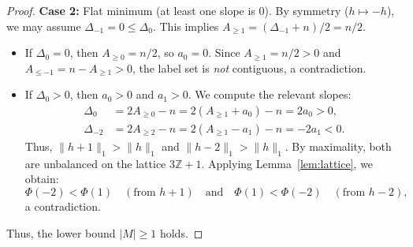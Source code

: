 \documentclass[10pt,a4paper]{amsart}
\newcommand{\Z}{\mathbb{Z}}
\begin{document}
\begin{proof}
\smallskip
\textbf{Case 2:} Flat minimum (at least one slope is 0).
By symmetry ($h \mapsto -h$), we may assume $\Delta_{-1} = 0 \le \Delta_0$. This implies $A_{\ge 1} = (\Delta_{-1}+n)/2 = n/2$.
\begin{itemize}
    \item If $\Delta_0 = 0$, then $A_{\ge 0} = n/2$, so $a_0 = 0$. Since $A_{\ge 1} = n/2 > 0$ and $A_{\le -1} = n-A_{\geq 1} > 0$, the label set is \emph{not} contiguous, a contradiction.
    
    \item If $\Delta_0 > 0$, then $a_0 > 0$ and $a_1 > 0$. We compute the relevant slopes:
    \begin{align*}
        \Delta_0 &= 2A_{\ge 0} - n = 2(A_{\ge 1} + a_0) - n = 2a_0 > 0, \\ 
        \Delta_{-2} &= 2A_{\ge 2} - n = 2(A_{\ge 1} - a_1) - n = -2a_1 < 0.
    \end{align*}
    Thus, $\|h+1\|_1 > \|h\|_1$ and $\|h-2\|_1 > \|h\|_1$. By maximality, both are unbalanced on the lattice $3\Z+1$. Applying Lemma~\ref{lem:lattice}, we obtain:
    \[
       \Phi(-2) < \Phi(1) \quad (\text{from } h+1) 
       \quad \text{and} \quad
       \Phi(1) < \Phi(-2) \quad (\text{from } h-2),
    \]
    a contradiction.
\end{itemize}
Thus, the lower bound $|M| \ge 1$ holds. \end{proof}
\end{document}
